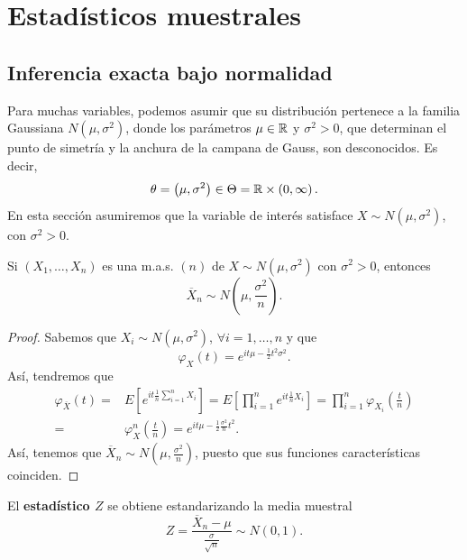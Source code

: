\chapter{Estadísticos muestrales}
\section{Inferencia exacta bajo normalidad}
Para muchas variables, podemos asumir que su distribución pertenece a la familia Gaussiana $\displaystyle N\left(\mu, \sigma^{2}\right) $, donde los parámetros $\displaystyle \mu\in \mathbb{R} $ y $\displaystyle \sigma^{2} > 0 $, que determinan el punto de simetría y la anchura de la campana de Gauss, son desconocidos. Es decir, 
\[\theta = \left(\mu, \sigma^{2}\right)\in \Theta = \mathbb{R} \times \left(0, \infty\right) .\]
En esta sección asumiremos que la variable de interés satisface $\displaystyle X \sim N\left(\mu, \sigma^{2}\right) $, con $\displaystyle \sigma^{2} > 0 $. 
\begin{theorem}
	Si $\displaystyle \left(X_{1}, \ldots, X_{n}\right) $ es una m.a.s. $\displaystyle \left(n\right) $ de $\displaystyle X \sim N\left(\mu, \sigma^{2}\right) $ con $\displaystyle \sigma^{2} > 0 $, entonces 
	\[\overline{X}_{n}\sim N\left(\mu, \frac{\sigma^{2}}{n}\right) .\]
\end{theorem}
\begin{proof}
Sabemos que $\displaystyle X_{i}\sim N\left(\mu, \sigma^{2}\right) $, $\displaystyle \forall i = 1, \ldots, n $ y que 
\[\varphi_{X}\left(t\right)=e^{it\mu - \frac{1}{2}t ^{2}\sigma^{2}} .\]
Así, tendremos que 
\[
\begin{split}
	\varphi_{\overline{X}}\left(t\right)= & E\left[e^{it\frac{1}{n}\sum^{n}_{i = 1}X_{i}}\right] = E\left[\prod^{n}_{i = 1}e^{it\frac{1}{n}X_{i}}\right] =\prod^{n}_{i = 1}\varphi_{X_{i}}\left(\frac{t}{n}\right)\\
	= & \varphi^{n}_{X}\left(\frac{t}{n}\right)=e^{it\mu - \frac{1}{2}\frac{\sigma^{2}}{n}t ^{2}} .
\end{split}
\]
Así, tenemos que $\displaystyle \overline{X}_{n}\sim N\left(\mu, \frac{\sigma^{2}}{n}\right) $, puesto que sus funciones características coinciden. 
\end{proof}
\begin{definition}
El \textbf{estadístico $\displaystyle Z $} se obtiene estandarizando la media muestral
\[Z = \frac{\overline{X}_{n}-\mu}{\frac{\sigma }{\sqrt{n}}}\sim N\left(0,1\right) .\]
\end{definition}
